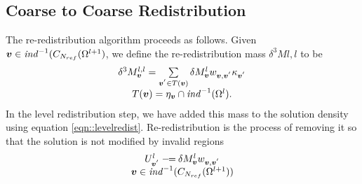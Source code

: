 \subsection{Coarse to Coarse Redistribution}

The re-redistribution algorithm proceeds as follows.
Given ${\boldsymbol{v}} \in {\it ind}^{-1}(C_{{N}_{ref}}(\Omega^{l+1})$,
we define the re-redistribution mass $\delta^3 M{l,l}$ to be 
\begin{equation}
\begin{array}{c}
\delta^3 M^{l,l}_{\boldsymbol{v}} = 
\sum\limits_{{\boldsymbol{v}^{'}} \in T({\boldsymbol{v}})}  \delta M^l_{{\boldsymbol{v}}}
w_{{\boldsymbol{v}},{\boldsymbol{v}^{'}}} \kappa_{\boldsymbol{v}^{'}}
\\
T({\boldsymbol{v}}) = \eta_{{\boldsymbol{v}}} \cap {\it ind}^{-1}(\Omega^l).
\end{array}
\label{eqn::doublesmush}
\end{equation}
In the level redistribution step, we have added this mass
to the solution density using equation \ref{eqn::levelredist}.
Re-redistribution is the process of removing it so
that the solution is not modified by invalid regions
\begin{equation}
\begin{array}{c}
U^{l}_{{\boldsymbol{v}^{'}}} \mathbin{-\mkern-7mu=}  
\delta M^l_{{\boldsymbol{v}}} w_{{\boldsymbol{v}},{\boldsymbol{v}^{'}}} \\
{\boldsymbol{v}} \in {\it ind}^{-1}(C_{{N}_{ref}}(\Omega^{l+1}))
\end{array}
\end{equation}



